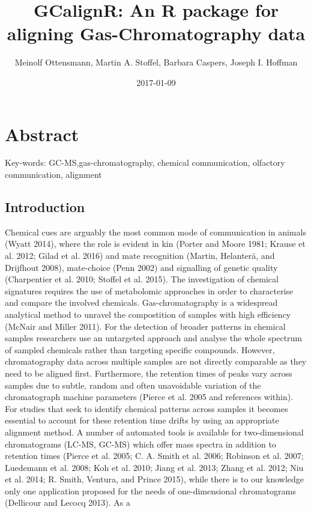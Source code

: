 \documentclass[]{article}
\title{GCalignR: An R package for aligning Gas-Chromatography data}
\author{Meinolf Ottensmann, Martin A. Stoffel, Barbara Caspers, Joseph I.
Hoffman}
\date{2017-01-09}
\begin{document}
\maketitle

\section{Abstract}\label{abstract}

Key-words: GC-MS,gas-chromatography, chemical communication, olfactory
communication, alignment

\subsection{Introduction}\label{introduction}

Chemical cues are arguably the most common mode of communication in
animals (Wyatt 2014), where the role is evident in kin (Porter and Moore
1981; Krause et al. 2012; Gilad et al. 2016) and mate recognition
(Martin, Helanterä, and Drijfhout 2008), mate-choice (Penn 2002) and
signalling of genetic quality (Charpentier et al. 2010; Stoffel et al.
2015). The investigation of chemical signatures requires the use of
metabolomic approaches in order to characterise and compare the involved
chemicals. Gas-chromatography is a widespread analytical method to
unravel the compostition of samples with high efficiency (McNair and
Miller 2011). For the detection of broader patterns in chemical samples
researchers use an untargeted approach and analyse the whole spectrum of
sampled chemicals rather than targeting specific compounds. However,
chromatography data across multiple samples are not directly comparable
as they need to be aligned first. Furthermore, the retention times of
peaks vary across samples due to subtle, random and often unavoidable
variation of the chromatograph machine parameters (Pierce et al. 2005
and references within). For studies that seek to identify chemical
patterns across samples it becomes essential to account for these
retention time drifts by using an appropriate alignment method. A number
of automated tools is available for two-dimensional chromatograms
(LC-MS, GC-MS) which offer mass spectra in addition to retention times
(Pierce et al. 2005; C. A. Smith et al. 2006; Robinson et al. 2007;
Luedemann et al. 2008; Koh et al. 2010; Jiang et al. 2013; Zhang et al.
2012; Niu et al. 2014; R. Smith, Ventura, and Prince 2015), while there
is to our knowledge only one application proposed for the needs of
one-dimensional chromatograms (Dellicour and Lecocq 2013). As a
\end{document}

